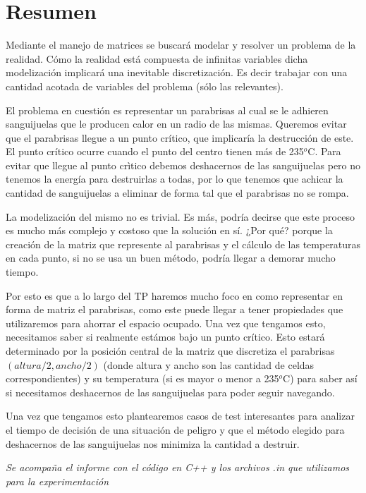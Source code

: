\section{Resumen}

Mediante el manejo de matrices se buscará modelar y resolver un problema de la realidad. Cómo la realidad está compuesta de infinitas variables dicha modelización implicará una inevitable discretización. Es decir trabajar con una 
cantidad acotada de variables del problema (sólo las relevantes).

El problema en cuestión es representar un parabrisas al cual se le adhieren sanguijuelas que le producen calor en un radio de las mismas. Queremos evitar que el parabrisas llegue a un punto crítico, que implicaría la destrucción de este. El punto crítico ocurre cuando el punto del centro tienen más de 235${}^o$C. Para evitar que llegue al punto crìtico debemos deshacernos de las sanguijuelas pero no tenemos la energía para destruirlas a todas, por lo que tenemos que achicar la cantidad de sanguijuelas a eliminar de forma tal que el parabrisas no se rompa.

La modelización del mismo no es trivial. Es más, podría decirse que este proceso es mucho más complejo y costoso que la solución en sí. ¿Por qué? porque la creación de la matriz que represente al parabrisas y el cálculo de las temperaturas en cada punto, si no se usa un buen método, podría llegar a demorar mucho tiempo. 

Por esto es que a lo largo del TP haremos mucho foco en como representar en forma de matriz el parabrisas, como este puede llegar a tener propiedades que utilizaremos para ahorrar el espacio ocupado. Una vez que tengamos esto, necesitamos saber si realmente estámos bajo un punto crítico. Esto estará determinado por la posición central  de la matriz que discretiza el parabrisas $(altura/2,ancho/2)$ (donde altura y ancho son las cantidad de celdas correspondientes) y su temperatura (si es mayor o menor a 235${}^o$C) para saber así si necesitamos deshacernos de las sanguijuelas para poder seguir navegando.

Una vez que tengamos esto plantearemos casos de test interesantes para analizar el tiempo de decisión de una situación de peligro y que el método elegido para deshacernos de las sanguijuelas nos minimiza la cantidad a destruir.

\textit{Se acompaña el informe con el código en C++ y los archivos .in que utilizamos para la experimentación}


